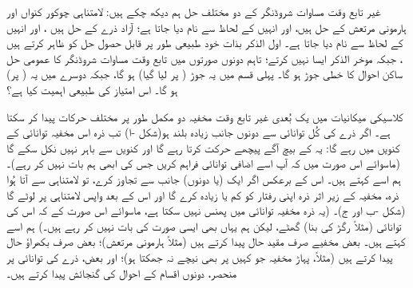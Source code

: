   غیر تابع وقت مساوات شروڈنگر کے  دو مختلف حل ہم  دیکھ چکے ہیں: لامتناہی چوکور کنواں اور ہارمونی مرتعش کے حل   ہیں، اور انہیں   کے لحاظ سے نام دیا جاتا ہے؛ آزاد ذرے کے حل   ہیں ، اور انہیں   کے لحاظ سے نام دیا جاتا ہے۔ اول الذکر بذات خود طبیعی طور پر قابل حصول حل کو ظاہر کرتے ہیں ، جبکہ موخر الذکر ایسا نہیں کرتے؛ تاہم دونوں صورتوں میں تابع وقت مساوات شروڈنگر کا عمومی حل ساکن احوال کا خطی جوڑ ہو گا۔ پہلی قسم میں یہ جوڑ ( پر لیا گیا)  ہو گا، جبکہ دوسرے میں یہ ( پر)  ہو گا۔ اس امتیاز کی طبیعی اہمیت کیا ہے؟

 کلاسیکی میکانیات میں یک بُعدی غیر تابع وقت مخفیہ دو مکمل طور پر مختلف حرکات پیدا کر سکتا ہے۔ اگر   ذرے کی کُل توانائی  سے دونوں جانب زیادہ بلند ہو(شکل -ا)  تب  ذرہ اس مخفیہ توانائی کے کنویں میں   رہے گا: یہ  کے بیچ آگے پیچھے حرکت کرتا رہے گا اور کنویں سے باہر نہیں نکل سکے گا (ماسوائے اس صورت میں کہ آپ اسے اضافی توانائی فراہم کریں جس کی ابھی ہم بات نہیں کر رہے)۔ ہم اسے  کہتے ہیں۔ اس کے برعکس اگر  ایک (یا دونوں)  جانب  سے تجاوز کرے،  تو لامتناہی سے آتا ہُوا ذرہ،  مخفیہ  کے زیر اثر ذرہ اپنی رفتار  کو کم یا زیادہ کرے گا اور اس کے بعد واپس لامتناہی پر لوٹے گا (شکل -ب اور ج)۔ (یہ ذرہ مخفیہ توانائی میں پھنس نہیں سکتا ہے، ماسوائے اس صورت کے  کہ اس کی توانائی (مثلاً رگڑ کی بنا) گھٹے، لیکن ہم یہاں بھی ایسی صورت کی بات نہیں کر رہے ہیں۔) ہم اسے  کہتے ہیں۔ بعض مخفیے   صرف مقید حال پیدا کرتے ہیں (مثلاً ہارمونی مرتعش)؛ بعض صرف بکھراؤ حال پیدا کرتے ہیں (مثلاً،  پہاڑ مخفیہ جو کہیں پر بھی نیچے نہ جھکتا ہو)؛ اور بعض، ذرے کی توانائی پر منحصر، دونوں اقسام کے  احوال کی گنجائش پیدا کرتے    ہیں۔
